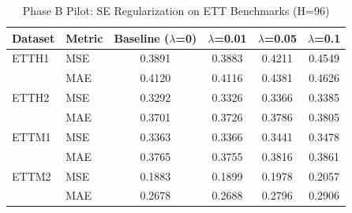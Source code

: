 
\begin{table}[t]
\centering
\caption{Phase B Pilot: SE Regularization on ETT Benchmarks (H=96)}
\label{tab:phase_b_pilot}
\small
\begin{tabular}{l l  c c c c}
\toprule
Dataset & Metric & Baseline ($\lambda$=0) & $\lambda$=0.01 & $\lambda$=0.05 & $\lambda$=0.1 \\
\midrule
ETTH1 & MSE & 0.3891 & 0.3883 & 0.4211 & 0.4549 \\
 & MAE & 0.4120 & 0.4116 & 0.4381 & 0.4626 \\
ETTH2 & MSE & 0.3292 & 0.3326 & 0.3366 & 0.3385 \\
 & MAE & 0.3701 & 0.3726 & 0.3786 & 0.3805 \\
ETTM1 & MSE & 0.3363 & 0.3366 & 0.3441 & 0.3478 \\
 & MAE & 0.3765 & 0.3755 & 0.3816 & 0.3861 \\
ETTM2 & MSE & 0.1883 & 0.1899 & 0.1978 & 0.2057 \\
 & MAE & 0.2678 & 0.2688 & 0.2796 & 0.2906 \\
\bottomrule
\end{tabular}
\end{table}
